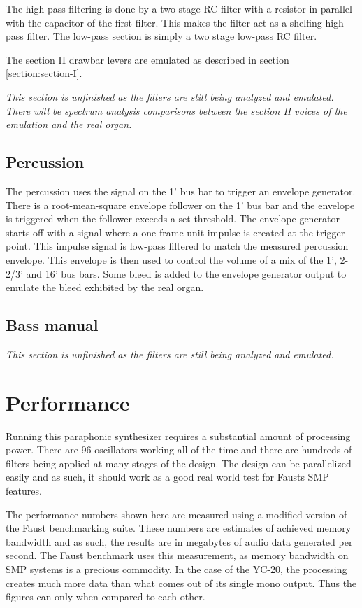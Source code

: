 \documentclass[11pt,a4paper]{article}
\begin{document}
The high pass filtering is done by a two stage RC filter with a resistor in parallel with the capacitor of the first filter. This makes the filter act as a shelfing high pass filter. The low-pass section is simply a two stage low-pass RC filter.

The section II drawbar levers are emulated as described in section \ref{section:section-I}.

\emph{This section is unfinished as the filters are still being analyzed and emulated. There will be spectrum analysis comparisons between the section II voices of the emulation and the real organ.}


\subsection{Percussion}

The percussion uses the signal on the 1' bus bar to trigger an envelope generator. There is a root-mean-square envelope follower on the 1' bus bar and the envelope is triggered when the follower exceeds a set threshold. The envelope generator starts off with a signal where a one frame unit impulse is created at the trigger point. This impulse signal is low-pass filtered to match the measured percussion envelope. This envelope is then used to control the volume of a mix of the 1', 2-2/3' and 16' bus bars. Some bleed is added to the envelope generator output to emulate the bleed exhibited by the real organ.

\subsection{Bass manual}

\emph{This section is unfinished as the filters are still being analyzed and emulated.}

\section{Performance}
\label{section:performance}

Running this paraphonic synthesizer requires a substantial amount of processing power. There are 96 oscillators working all of the time and there are hundreds of filters being applied at many stages of the design. The design can be parallelized easily and as such, it should work as a good real world test for Fausts SMP features.

The performance numbers shown here are measured using a modified version of the Faust benchmarking suite. These numbers are estimates of achieved memory bandwidth and as such, the results are in megabytes of audio data generated per second. The Faust benchmark uses this measurement, as memory bandwidth on SMP systems is a precious commodity. In the case of the YC-20, the processing creates much more data than what comes out of its single mono output. Thus the figures can only when compared to each other.
\end{document}
